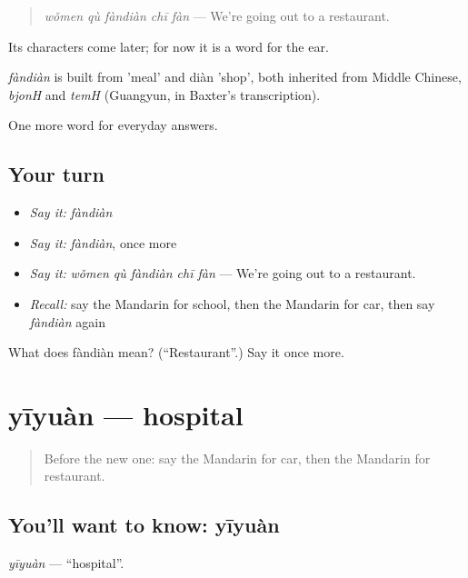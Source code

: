\begin{quote}
\emph{wǒmen qù fàndiàn chī fàn} — We're going out to a restaurant.
\end{quote}

Its characters come later; for now it is a word for the ear.

\begin{cousinweb}
\emph{fàndiàn} is built from  'meal' and diàn 'shop', both inherited from Middle Chinese, \emph{bjonH} and \emph{temH} (Guangyun, in Baxter's transcription).
\end{cousinweb}

\begin{grammarlens}[title={What you've built}]
One more word for everyday answers.
\end{grammarlens}

\subsection*{Your turn}
\begin{itemize}
\raggedright
  \item \emph{Say it:} \emph{fàndiàn}
  \item \emph{Say it:} \emph{fàndiàn}, once more
  \item \emph{Say it:} \emph{wǒmen qù fàndiàn chī fàn} — We're going out to a restaurant.
  \item \emph{Recall:} say the Mandarin for school, then the Mandarin for car, then say \emph{fàndiàn} again
\end{itemize}

\begin{tcolorbox}[breakable,colback=teal!4,colframe=teal!35!black,title={Before you move on}]
What does fàndiàn mean? (\textquotedblleft{}Restaurant\textquotedblright{}.) Say it once more.
\end{tcolorbox}
\section[yīyuàn]{yīyuàn — hospital}

\label{lesson:ZH-C44-yiyuan}



\begin{quote}
Before the new one: say the Mandarin for car, then the Mandarin for restaurant.
\end{quote}

\subsection*{You'll want to know: yīyuàn}
\emph{yīyuàn} — \textquotedblleft{}hospital\textquotedblright{}.

